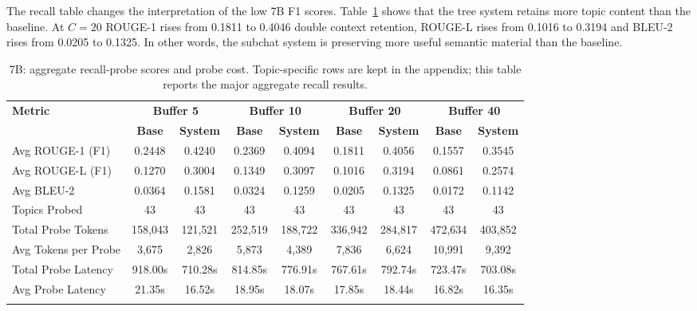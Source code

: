 \documentclass[pdflatex,sn-mathphys-num]{sn-jnl}%
\theoremstyle{thmstyleone}%
\theoremstyle{thmstyletwo}%
\theoremstyle{thmstylethree}%
\begin{document}




The recall table changes the interpretation of the low 7B F1 scores. Table~\ref{tab:7b_recall_main} shows that the tree system retains more topic content than the baseline. At $C=20$ ROUGE-1 rises from 0.1811 to 0.4046 double context retention, ROUGE-L rises from 0.1016 to 0.3194 and BLEU-2 rises from 0.0205 to 0.1325. In other words, the subchat system is preserving more useful semantic material than the baseline.





\begin{table}[htbp]
\caption{7B: aggregate recall-probe scores and probe cost. Topic-specific rows are kept in the appendix; this table reports the major aggregate recall results.}\label{tab:7b_recall_main}
\centering
\scriptsize
\setlength{\tabcolsep}{3pt}
\begin{adjustbox}{width=\textwidth}
\begin{tabular}{lcccccccc}
\toprule
\textbf{Metric} & \multicolumn{2}{c}{\textbf{Buffer 5}} & \multicolumn{2}{c}{\textbf{Buffer 10}} & \multicolumn{2}{c}{\textbf{Buffer 20}} & \multicolumn{2}{c}{\textbf{Buffer 40}} \\
\cmidrule(lr){2-3}\cmidrule(lr){4-5}\cmidrule(lr){6-7}\cmidrule(lr){8-9}
 & \textbf{Base} & \textbf{System} & \textbf{Base} & \textbf{System} & \textbf{Base} & \textbf{System} & \textbf{Base} & \textbf{System} \\
\midrule
Avg ROUGE-1 (F1) & 0.2448 & 0.4240 & 0.2369 & 0.4094 & 0.1811 & 0.4056 & 0.1557 & 0.3545 \\
Avg ROUGE-L (F1) & 0.1270 & 0.3004 & 0.1349 & 0.3097 & 0.1016 & 0.3194 & 0.0861 & 0.2574 \\
Avg BLEU-2 & 0.0364 & 0.1581 & 0.0324 & 0.1259 & 0.0205 & 0.1325 & 0.0172 & 0.1142 \\
Topics Probed & 43 & 43 & 43 & 43 & 43 & 43 & 43 & 43 \\
Total Probe Tokens & 158,043 & 121,521 & 252,519 & 188,722 & 336,942 & 284,817 & 472,634 & 403,852 \\
Avg Tokens per Probe & 3,675 & 2,826 & 5,873 & 4,389 & 7,836 & 6,624 & 10,991 & 9,392 \\
Total Probe Latency & 918.00s & 710.28s & 814.85s & 776.91s & 767.61s & 792.74s & 723.47s & 703.08s \\
Avg Probe Latency & 21.35s & 16.52s & 18.95s & 18.07s & 17.85s & 18.44s & 16.82s & 16.35s \\
\botrule
\end{tabular}
\end{adjustbox}
\end{table}
\end{document}
